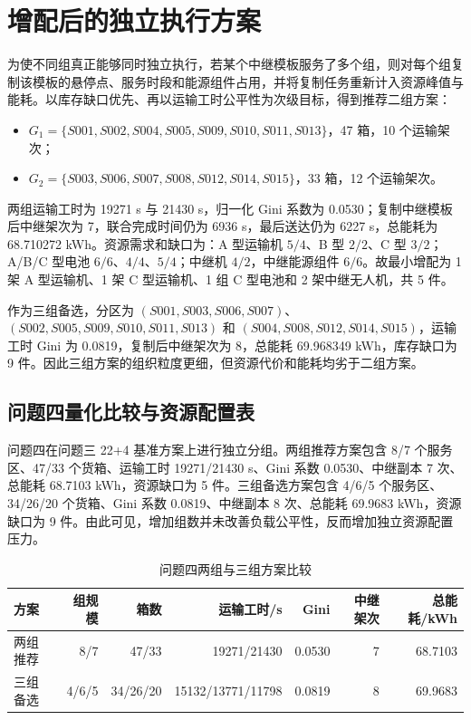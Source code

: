 \documentclass[UTF8,a4paper,12pt]{ctexart}
\begin{document}
\section{增配后的独立执行方案}
为使不同组真正能够同时独立执行，若某个中继模板服务了多个组，则对每个组复制该模板的悬停点、服务时段和能源组件占用，并将复制任务重新计入资源峰值与能耗。以库存缺口优先、再以运输工时公平性为次级目标，得到推荐二组方案：
\begin{itemize}
\item $G_1=\{S001,S002,S004,S005,S009,S010,S011,S013\}$，47 箱，10 个运输架次；
\item $G_2=\{S003,S006,S007,S008,S012,S014,S015\}$，33 箱，12 个运输架次。
\end{itemize}
两组运输工时为 19271 s 与 21430 s，归一化 Gini 系数为 0.0530；复制中继模板后中继架次为 7，联合完成时间仍为 6936 s，最后送达仍为 6227 s，总能耗为 68.710272 kWh。资源需求和缺口为：A 型运输机 $5/4$、B 型 $2/2$、C 型 $3/2$；A/B/C 型电池 $6/6$、$4/4$、$5/4$；中继机 $4/2$，中继能源组件 $6/6$。故最小增配为 1 架 A 型运输机、1 架 C 型运输机、1 组 C 型电池和 2 架中继无人机，共 5 件。

作为三组备选，分区为 $(S001,S003,S006,S007)$、$(S002,S005,S009,S010,S011,S013)$ 和 $(S004,S008,S012,S014,S015)$，运输工时 Gini 为 0.0819，复制后中继架次为 8，总能耗 69.968349 kWh，库存缺口为 9 件。因此三组方案的组织粒度更细，但资源代价和能耗均劣于二组方案。

\subsection{问题四量化比较与资源配置表}
问题四在问题三 22+4 基准方案上进行独立分组。两组推荐方案包含 8/7 个服务区、47/33 个货箱、运输工时 19271/21430 s、Gini 系数 0.0530、中继副本 7 次、总能耗 68.7103 kWh，资源缺口为 5 件。三组备选方案包含 4/6/5 个服务区、34/26/20 个货箱、Gini 系数 0.0819、中继副本 8 次、总能耗 69.9683 kWh，资源缺口为 9 件。由此可见，增加组数并未改善负载公平性，反而增加独立资源配置压力。

\begin{table}[H]\centering\caption{问题四两组与三组方案比较}\label{tab:q4compare}
\begin{tabular}{lrrrrrr}\toprule
方案&组规模&箱数&运输工时/s&Gini&中继架次&总能耗/kWh\\\midrule
两组推荐&8/7&47/33&19271/21430&0.0530&7&68.7103\\
三组备选&4/6/5&34/26/20&15132/13771/11798&0.0819&8&69.9683\\\bottomrule
\end{tabular}\end{table}
\end{document}
